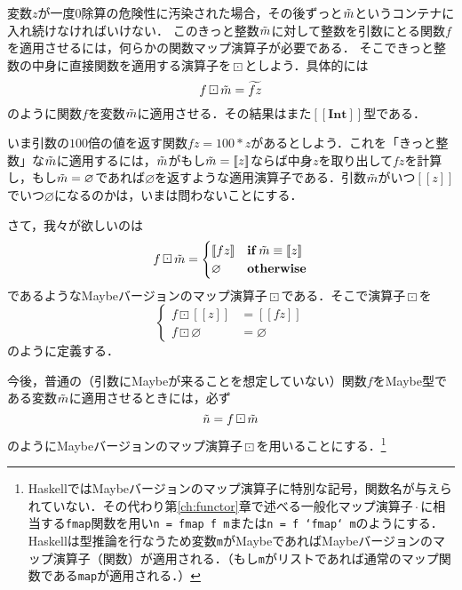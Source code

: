 \documentclass[twocolumn]{jsbook}
\def\[{[\![}
\def\]{]\!]}
\newcommand{\code}[1]{\texttt{#1}}
\newcommand{\hsklType}[1]{\textbf{#1}}
\DeclareMathOperator{\hsklFmap}{\cdot}
\DeclareMathOperator{\hsklMaybeMap}{\boxdot}
\newcommand{\hsklInt}{\hsklType{Int}}
\newcommand{\hsklNothing}{\varnothing}
\newcommand{\hsklJust}[1]{\[#1\]}
\newcommand{\hsklMaybe}[1]{\Tilde{#1}}
\newcommand{\hsklMaybeW}[1]{\widetilde{#1}}
\newcommand{\hsklMaybeType}[1]{\[#1\]}
\newcommand{\mathKeyword}[1]{\mathbf{#1}}
\DeclareMathOperator{\mathIf}{\mathKeyword{if}}
\newcommand{\mathOtherwise}{\mathKeyword{otherwise}}
\begin{document}
変数$z$が一度$0$除算の危険性に汚染された場合，その後ずっと$\hsklMaybe{m}$というコンテナに入れ続けなければいけない．
このきっと整数$\hsklMaybe{m}$に対して整数を引数にとる関数$f$を適用させるには，何らかの関数マップ演算子が必要である．
そこできっと整数の中身に直接関数を適用する演算子を$\hsklMaybeMap$としよう．具体的には$$f\hsklMaybeMap\hsklMaybe{m}=\hsklMaybeW{fz}$$のように関数$f$を変数$\hsklMaybe{m}$に適用させる．その結果はまた$\hsklMaybeType{\hsklInt}$型である．

いま引数の$100$倍の値を返す関数$fz=100*z$があるとしよう．これを「きっと整数」な$\hsklMaybe{m}$に適用するには，$\hsklMaybe{m}$がもし$\hsklMaybe{m}=\hsklJust{z}$ならば中身$z$を取り出して$fz$を計算し，もし$\hsklMaybe{m}=\hsklNothing$であれば$\hsklNothing$を返すような適用演算子である．引数$\hsklMaybe{m}$がいつ$\hsklJust{z}$でいつ$\hsklNothing$になるのかは，いまは問わないことにする．

さて，我々が欲しいのは
\begin{equation*}
f\hsklMaybeMap\hsklMaybe{m}=\begin{cases}
\hsklJust{fz}&\mathIf\hsklMaybe{m}\equiv\hsklJust{z}\\
\hsklNothing&\mathOtherwise
\end{cases}
\end{equation*}
であるようなMaybeバージョンのマップ演算子$\hsklMaybeMap$である．そこで演算子$\hsklMaybeMap$を
\begin{equation*}
\left\{
\begin{split}
f\hsklMaybeMap\hsklJust{z}&=\hsklJust{fz}\\
f\hsklMaybeMap\hsklNothing&=\hsklNothing
\end{split}
\right.
\end{equation*}
のように定義する．

今後，普通の（引数にMaybeが来ることを想定していない）関数$f$をMaybe型である変数$\hsklMaybe{m}$に適用させるときには，必ず$$\hsklMaybe{n}=f\hsklMaybeMap\hsklMaybe{m}$$のようにMaybeバージョンのマップ演算子$\hsklMaybeMap$を用いることにする．\footnote{HaskellではMaybeバージョンのマップ演算子に特別な記号，関数名が与えられていない．その代わり第\ref{ch:functor}章で述べる一般化マップ演算子$\hsklFmap$に相当する\code{fmap}関数を用い\code{n = fmap f m}または\code{n = f `fmap` m}のようにする．Haskellは型推論を行なうため変数\code{m}がMaybeであればMaybeバージョンのマップ演算子（関数）が適用される．（もし\code{m}がリストであれば通常のマップ関数である\code{map}が適用される．）}

\end{document}
